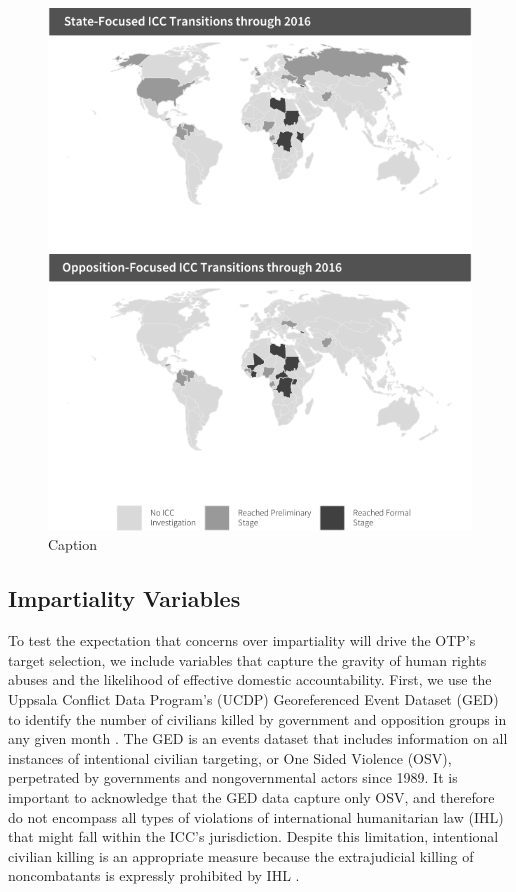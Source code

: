 \begin{figure}
    \centering
    \includegraphics[width=1\textwidth]{iccMaps.pdf}
    \caption{Caption}
    \label{fig:iccMaps}
\end{figure}
\FloatBarrier

\subsection*{Impartiality Variables}

To test the expectation that concerns over impartiality will drive the OTP's target selection, we include variables that capture the gravity of human rights abuses and the likelihood of effective domestic accountability. First, we use the Uppsala Conflict Data Program's (UCDP) Georeferenced Event Dataset (GED) to identify the number of civilians killed by government and opposition groups in any given month \citep{sundberg2013introducing}. The GED is an events dataset that includes information on all instances of intentional civilian targeting, or One Sided Violence (OSV), perpetrated by governments and nongovernmental actors since 1989. It is important to acknowledge that the GED data capture only OSV, and therefore do not encompass all types of violations of international humanitarian law (IHL) that might fall within the ICC's jurisdiction. Despite this limitation, intentional civilian killing is an appropriate measure because the extrajudicial killing of noncombatants is expressly prohibited by IHL \citep{blank2018international}.


